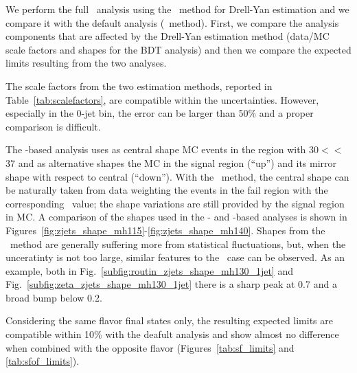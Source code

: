 We perform the full \hww\ analysis using the \zm\ method for Drell-Yan estimation and we compare it with the default analysis (\routin\ method).
First, we compare the analysis components that are affected by the Drell-Yan estimation method 
(data/MC scale factors and shapes for the BDT analysis) and then we compare the expected limits resulting from the two analyses.

The scale factors from the two estimation methods, reported in Table~\ref{tab:scalefactors}, are compatible within the uncertainties.
However, especially in the 0-jet bin, the error can be larger than 50\% and a proper comparison is difficult.

The \routin-based analysis uses as central shape MC events in the region with 30$<$\met$<$37 \GeV and as alternative shapes the MC in the signal region (``up'')
 and its mirror shape with respect to central (``down'').
With the \zm\ method, the central shape can be naturally taken from data weighting the events in the fail region with the corresponding \zm\ value;
the shape variations are still provided by the signal region in MC.
A comparison of the shapes used in the \routin- and \zm-based analyses is shown in Figures~\ref{fig:zjets_shape_mh115}-\ref{fig:zjets_shape_mh140}.
Shapes from the \zm\ method are generally suffering more from statistical fluctuations, but, when the unceratinty is not too large, 
similar features to the \routin\ case can be observed. As an example, both in Fig.~\ref{subfig:routin_zjets_shape_mh130_1jet} and 
Fig.~\ref{subfig:zeta_zjets_shape_mh130_1jet} there is a sharp peak at 0.7 and a broad bump below 0.2.

Considering the same flavor final states only, the resulting expected limits are compatible  within 10\% with the deafult analysis and 
show almost no difference when combined with the opposite flavor (Figures~\ref{tab:sf_limits} and \ref{tab:sfof_limits}).

